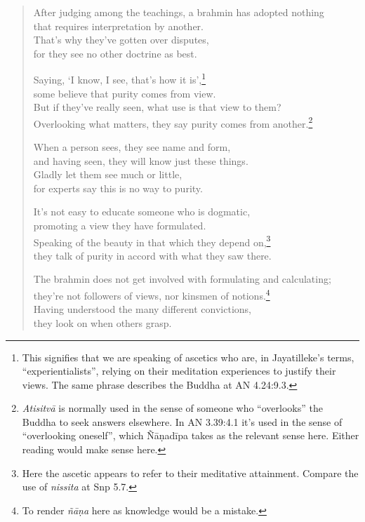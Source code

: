 \documentclass[12pt,openany]{book}%
\begin{document}
\begin{verse}
After judging among the teachings, a brahmin has adopted nothing \\
that requires interpretation by another. \\
That’s why they’ve gotten over disputes, \\
for they see no other doctrine as best. 

Saying, ‘I know, I see, that’s how it is’,\footnote{This signifies that we are speaking of ascetics who are, in Jayatilleke’s terms, “experientialists”, relying on their meditation experiences to justify their views. The same phrase describes the Buddha at AN 4.24:9.3. } \\
some believe that purity comes from view. \\
But if they’ve really seen, what use is that view to them? \\
Overlooking what matters, they say purity comes from another.\footnote{\textit{\textsanskrit{Atisitvā}} is normally used in the sense of someone who “overlooks” the Buddha to seek answers elsewhere. In AN 3.39:4.1 it’s used in the sense of “overlooking oneself”, which \textsanskrit{Ñāṇadīpa} takes as the relevant sense here. Either reading would make sense here. } 

When a person sees, they see name and form, \\
and having seen, they will know just these things. \\
Gladly let them see much or little, \\
for experts say this is no way to purity. 

It’s not easy to educate someone who is dogmatic, \\
promoting a view they have formulated. \\
Speaking of the beauty in that which they depend on,\footnote{Here the ascetic appears to refer to their meditative attainment. Compare the use of \textit{nissita} at Snp 5.7. } \\
they talk of purity in accord with what they saw there. 

The brahmin does not get involved with formulating and calculating; \\
they’re not followers of views, nor kinsmen of notions.\footnote{To render \textit{\textsanskrit{ñāṇa}} here as knowledge would be a mistake. } \\
Having understood the many different convictions, \\
they look on when others grasp. 


\end{verse}
\end{document}
